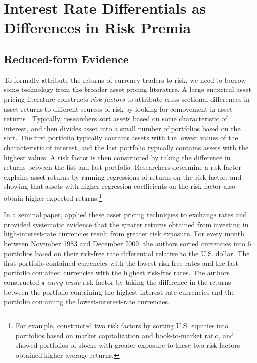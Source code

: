 \section{Interest Rate Differentials as Differences in Risk Premia}



\subsection{Reduced-form Evidence}

To formally attribute the returns of currency traders to risk, we need
to borrow some technology from the broader asset pricing literature.
A large empirical asset pricing literature constructs
\emph{risk-factors} to attribute cross-sectional differences in asset
returns to different sources of risk by looking for comovement in
asset returns \citep{Fama1976}. Typically, researchers sort assets
based on some characteristic of interest, and then divides asset into
a small number of portfolios based on the sort. The first portfolio
typically contains assets with the lowest values of the characteristic
of interest, and the last portfolio typically contains assets with the
highest values. A risk factor is then constructed by taking the
difference in returns between the fist and last portfolio. Researchers
determine a risk factor explains asset returns by running regressions
of returns on the risk factor, and showing that assets with higher
regression coefficients on the risk factor also obtain higher expected
returns.\footnote{For example, \citet{FamaFrench1992} constructed two
  risk factors by sorting U.S. equities into portfolios based on
  market capitalization and book-to-market ratio, and showed
  portfolios of stocks with greater exposure to these two risk factors
  obtained higher average returns.}


In a seminal paper, \citet{LustigRoussanovVerdelhan2011} applied these
asset pricing techniques to exchange rates and provided systematic
evidence that the greater returns obtained from investing in
high-interest-rate currencies result from greater risk exposure. For
every month between November 1983 and December 2009, the authors
sorted currencies into 6 portfolios based on their risk-free rate
differential relative to the U.S. dollar. The first portfolio
contained currencies with the lowest risk-free rates and the last
portfolio contained currencies with the highest risk-free rates. The
authors constructed a \emph{carry trade} risk factor by taking the
difference in the returns between the portfolio containing the
highest-interest-rate currencies and the portfolio containing the
lowest-interest-rate currencies.

